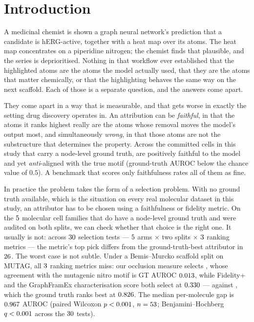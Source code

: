 \section{Introduction}

A medicinal chemist is shown a graph neural network's prediction that a
candidate is hERG-active, together with a heat map over its atoms. The heat map
concentrates on a piperidine nitrogen; the chemist finds that plausible, and the
series is deprioritised. Nothing in that workflow ever established that the
highlighted atoms are the atoms the model actually used, that they are the atoms
that matter chemically, or that the highlighting behaves the same way on the
next scaffold. Each of those is a separate question, and the answers come apart.

They come apart in a way that is measurable, and that gets worse in exactly the
setting drug discovery operates in. An attribution can be \emph{faithful}, in
that the atoms it ranks highest really are the atoms whose removal moves the
model's output most, and simultaneously \emph{wrong}, in that those atoms are
not the substructure that determines the property. Across the \nGtCells{}
committed cells in this study that carry a node-level ground truth,
\nFaithfulButWrong{} are positively faithful to the model and yet
\emph{anti}-aligned with the true motif (ground-truth AUROC below the chance
value of $0.5$). A benchmark that scores only faithfulness rates all of them as
fine.

In practice the problem takes the form of a selection problem. With no ground
truth available, which is the situation on every real molecular dataset in this
study, an attributor has to be chosen using a faithfulness or fidelity metric.
On the $5{}$ molecular cell families that do have a node-level ground
truth and were audited on both splits, we can check whether that choice is the
right one. It usually is not: across $30{}$ selection tests ---
$5{}$ arms $\times$ two splits $\times$ $3{}$ ranking
metrics --- the metric's top pick differs from the ground-truth-best attributor
in $26{}$. The worst case is not subtle. Under a Bemis--Murcko
scaffold split on MUTAG, all $3{}$ ranking metrics miss: our
occlusion measure selects \mutShiftPickOccspearman{}, whose agreement with the
mutagenic nitro motif is GT AUROC $0.013{}$, while
Fidelity+ and the GraphFramEx characterisation score both select
\mutShiftPickFidelityplus{} at $0.330{}$ --- against
\mutShiftGtBest{}, which the ground truth ranks best at
$0.826{}$. The median per-molecule gap
is $0.967{}$ AUROC (paired Wilcoxon
$p<0.001{}$, $n=53{}$;
Benjamini--Hochberg $q<0.001{}$ across the
$30{}$ tests).

